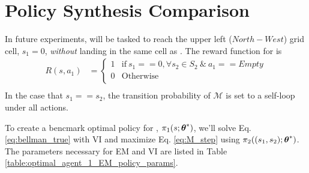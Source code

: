     \begin{figure}[htb]
        \begin{center}
        \end{center}
\end{figure}


\section{Policy Synthesis Comparison} \label{sec:em_vi_comparison}
In future experiments,  will be tasked to reach the upper left ($North-West$) grid cell, $s_1=0$,
\emph{without} landing in the same cell as . The reward function for  is
\begin{align*}
        R(s,a_1) & = \begin{cases}
1 & \text{if}\ s_1 == 0, \forall s_2 \in S_2\ \&\ a_1==Empty \\
0 & \text{Otherwise} \\
\end{cases} \\
\end{align*}
In the case that $s_1==s_2$, the transition probability of $\mathcal{M}$ is set to a self-loop under all actions.

To create a bencmark optimal policy for , $\pi_{1}(s;\boldsymbol{\mathbb{\theta}}^*)$, we'll solve Eq.
\ref{eq:bellman_true} with \ac{VI} and maximize Eq. \ref{eq:M_step} using $\pi_{2}((s_1,s_2);\boldsymbol{\mathbb{\theta}}^*)$.
The parameters necessary for EM and VI are listed in Table \ref{table:optimal_agent_1_EM_policy_params}.

